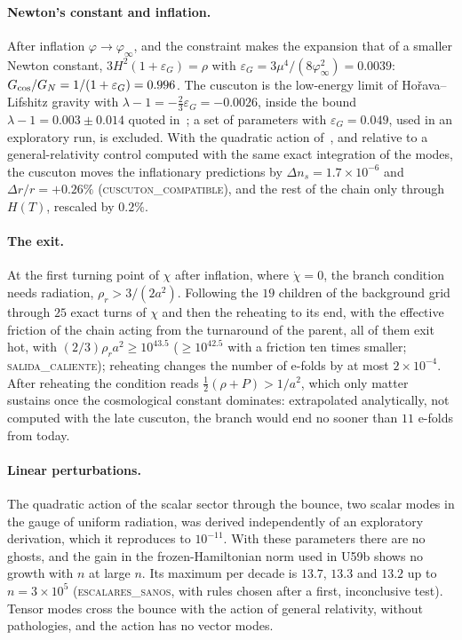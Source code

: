 \documentclass[11pt,a4paper]{article}
\begin{document}
\paragraph{Newton's constant and inflation.}
After inflation $\varphi\to\varphi_\infty$, and the constraint makes the expansion that of a smaller Newton constant, $3H^2(1+\varepsilon_G)=\rho$ with $\varepsilon_G=3\mu^4/(8\varphi_\infty^2)=0.0039$: $G_{\rm cos}/G_N=1/(1+\varepsilon_G)=0.996$.
The cuscuton is the low-energy limit of Ho\v{r}ava--Lifshitz gravity with $\lambda-1=-\tfrac23\varepsilon_G=-0.0026$, inside the bound $\lambda-1=0.003\pm0.014$ quoted in~\cite{Afshordi2009}; a set of parameters with $\varepsilon_G=0.049$, used in an exploratory run, is excluded.
With the quadratic action of~\cite{BKG2017}, and relative to a general-relativity control computed with the same exact integration of the modes, the cuscuton moves the inflationary predictions by $\Delta n_s=1.7\times10^{-6}$ and $\Delta r/r=+0.26\%$ (\textsc{cuscuton\_compatible}), and the rest of the chain only through $H(T)$, rescaled by $0.2\%$.

\paragraph{The exit.}
At the first turning point of $\chi$ after inflation, where $\dot\chi=0$, the branch condition needs radiation, $\rho_r>3/(2a^2)$.
Following the $19$ children of the background grid through $25$ exact turns of $\chi$ and then the reheating to its end, with the effective friction of the chain acting from the turnaround of the parent, all of them exit hot, with $(2/3)\rho_ra^2\ge10^{43.5}$ ($\ge10^{42.5}$ with a friction ten times smaller; \textsc{salida\_caliente}); reheating changes the number of e-folds by at most $2\times10^{-4}$.
After reheating the condition reads $\tfrac12(\rho+P)>1/a^2$, which only matter sustains once the cosmological constant dominates: extrapolated analytically, not computed with the late cuscuton, the branch would end no sooner than $11$ e-folds from today.

\paragraph{Linear perturbations.}
The quadratic action of the scalar sector through the bounce, two scalar modes in the gauge of uniform radiation, was derived independently of an exploratory derivation, which it reproduces to $10^{-11}$. With these parameters there are no ghosts, and the gain in the frozen-Hamiltonian norm used in U59b shows no growth with $n$ at large $n$. Its maximum per decade is $13.7$, $13.3$ and $13.2$ up to $n=3\times10^5$ (\textsc{escalares\_sanos}, with rules chosen after a first, inconclusive test).
Tensor modes cross the bounce with the action of general relativity, without pathologies, and the action has no vector modes.
\end{document}
